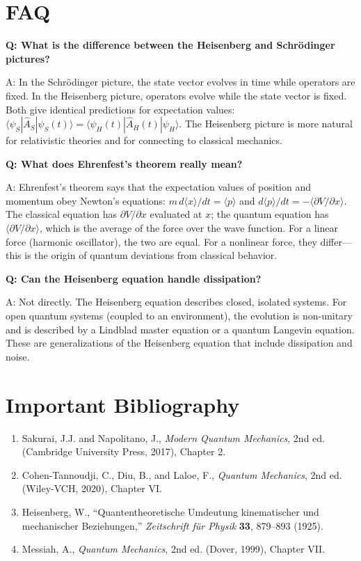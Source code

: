\section*{FAQ}

\textbf{Q: What is the difference between the Heisenberg and Schr\"odinger pictures?}

A: In the Schr\"odinger picture, the state vector evolves in time while operators are fixed. In the Heisenberg picture, operators evolve while the state vector is fixed. Both give identical predictions for expectation values: $\langle\psi_S|\hat{A}_S|\psi_S(t)\rangle = \langle\psi_H(t)|\hat{A}_H(t)|\psi_H\rangle$. The Heisenberg picture is more natural for relativistic theories and for connecting to classical mechanics.

\textbf{Q: What does Ehrenfest's theorem really mean?}

A: Ehrenfest's theorem says that the expectation values of position and momentum obey Newton's equations: $m\,d\langle x\rangle/dt = \langle p\rangle$ and $d\langle p\rangle/dt = -\langle\partial V/\partial x\rangle$. The classical equation has $\partial V/\partial x$ evaluated at $x$; the quantum equation has $\langle\partial V/\partial x\rangle$, which is the average of the force over the wave function. For a linear force (harmonic oscillator), the two are equal. For a nonlinear force, they differ---this is the origin of quantum deviations from classical behavior.

\textbf{Q: Can the Heisenberg equation handle dissipation?}

A: Not directly. The Heisenberg equation describes closed, isolated systems. For open quantum systems (coupled to an environment), the evolution is non-unitary and is described by a Lindblad master equation or a quantum Langevin equation. These are generalizations of the Heisenberg equation that include dissipation and noise.
\section*{Important Bibliography}

\begin{enumerate}
\item Sakurai, J.J. and Napolitano, J., \textit{Modern Quantum Mechanics}, 2nd ed. (Cambridge University Press, 2017), Chapter 2.
\item Cohen-Tannoudji, C., Diu, B., and Laloe, F., \textit{Quantum Mechanics}, 2nd ed. (Wiley-VCH, 2020), Chapter VI.
\item Heisenberg, W., ``Quantentheoretische Umdeutung kinematischer und mechanischer Beziehungen,'' \textit{Zeitschrift f\"ur Physik} \textbf{33}, 879--893 (1925).
\item Messiah, A., \textit{Quantum Mechanics}, 2nd ed. (Dover, 1999), Chapter VII.
\end{enumerate}

